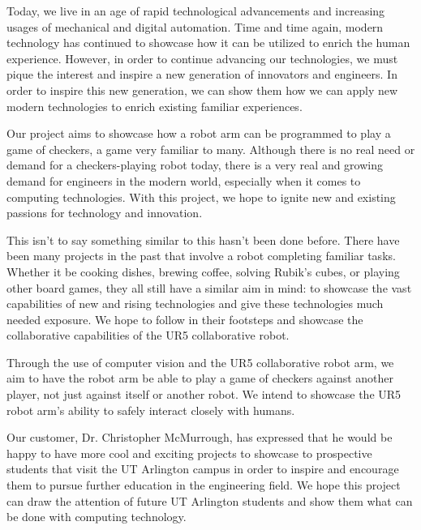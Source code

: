 
Today, we live in an age of rapid technological advancements and increasing usages of mechanical and digital automation. Time and time again, modern technology has continued to showcase how it can be utilized to enrich the human experience. However, in order to continue advancing our technologies, we must pique the interest and inspire a new generation of innovators and engineers. In order to inspire this new generation, we can show them how we can apply new modern technologies to enrich existing familiar experiences.

Our project aims to showcase how a robot arm can be programmed to play a game of checkers, a game very familiar to many. Although there is no real need or demand for a checkers-playing robot today, there is a very real and growing demand for engineers in the modern world, especially when it comes to computing technologies. With this project, we hope to ignite new and existing passions for technology and innovation.

This isn't to say something similar to this hasn't been done before. There have been many projects in the past that involve a robot completing familiar tasks. Whether it be cooking dishes, brewing coffee, solving Rubik's cubes, or playing other board games, they all still have a similar aim in mind: to showcase the vast capabilities of new and rising technologies and give these technologies much needed exposure. We hope to follow in their footsteps and showcase the collaborative capabilities of the UR5 collaborative robot.

Through the use of computer vision and the UR5 collaborative robot arm, we aim to have the robot arm be able to play a game of checkers against another player, not just against itself or another robot. We intend to showcase the UR5 robot arm's ability to safely interact closely with humans.

Our customer, Dr. Christopher McMurrough, has expressed that he would be happy to have more cool and exciting projects to showcase to prospective students that visit the UT Arlington campus in order to inspire and encourage them to pursue further education in the engineering field. We hope this project can draw the attention of future UT Arlington students and show them what can be done with computing technology.